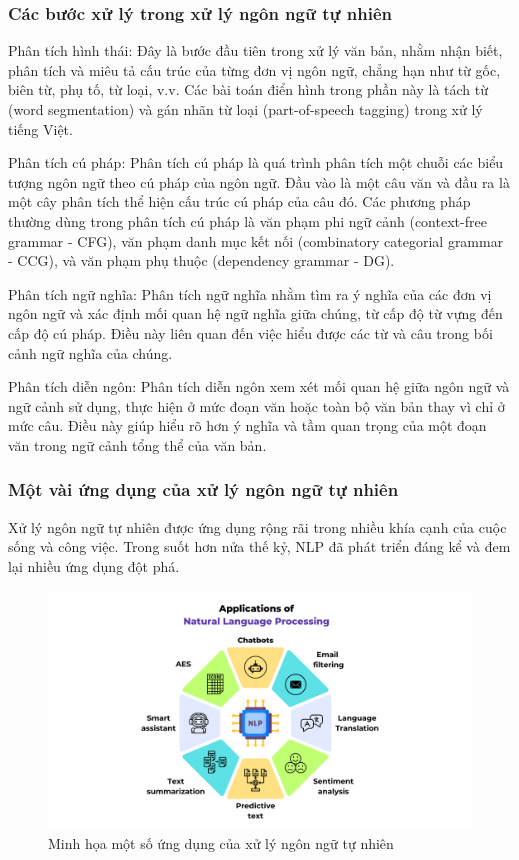\subsubsection{Các bước xử lý trong xử lý ngôn ngữ tự nhiên}

Phân tích hình thái: Đây là bước đầu tiên trong xử lý văn bản, nhằm nhận biết, phân tích và miêu tả cấu trúc của từng đơn vị ngôn ngữ, chẳng hạn như từ gốc, biên từ, phụ tố, từ loại, v.v. Các bài toán điển hình trong phần này là tách từ (word segmentation) và gán nhãn từ loại (part-of-speech tagging) trong xử lý tiếng Việt.

Phân tích cú pháp: Phân tích cú pháp là quá trình phân tích một chuỗi các biểu tượng ngôn ngữ theo cú pháp của ngôn ngữ. Đầu vào là một câu văn và đầu ra là một cây phân tích thể hiện cấu trúc cú pháp của câu đó. Các phương pháp thường dùng trong phân tích cú pháp là văn phạm phi ngữ cảnh (context-free grammar - CFG), văn phạm danh mục kết nối (combinatory categorial grammar - CCG), và văn phạm phụ thuộc (dependency grammar - DG).

Phân tích ngữ nghĩa: Phân tích ngữ nghĩa nhằm tìm ra ý nghĩa của các đơn vị ngôn ngữ và xác định mối quan hệ ngữ nghĩa giữa chúng, từ cấp độ từ vựng đến cấp độ cú pháp. Điều này liên quan đến việc hiểu được các từ và câu trong bối cảnh ngữ nghĩa của chúng.

Phân tích diễn ngôn: Phân tích diễn ngôn xem xét mối quan hệ giữa ngôn ngữ và ngữ cảnh sử dụng, thực hiện ở mức đoạn văn hoặc toàn bộ văn bản thay vì chỉ ở mức câu. Điều này giúp hiểu rõ hơn ý nghĩa và tầm quan trọng của một đoạn văn trong ngữ cảnh tổng thể của văn bản.

\subsubsection{Một vài ứng dụng của xử lý ngôn ngữ tự nhiên}

Xử lý ngôn ngữ tự nhiên được ứng dụng rộng rãi trong nhiều khía cạnh của cuộc sống và công việc. Trong suốt hơn nửa thế kỷ, NLP đã phát triển đáng kể và đem lại nhiều ứng dụng đột phá.

\begin{figure}[htb]
    \centering
    \includegraphics[width=\textwidth]{image/applications-of-nlp.png}
    \caption{Minh họa một số ứng dụng của xử lý ngôn ngữ tự nhiên \cite{webpage26}}
    \label{fig:applications-of-nlp}
\end{figure}

